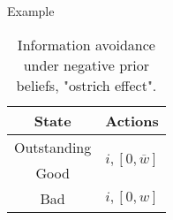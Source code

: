 \documentclass[usenames,dvipsnames,aspectratio=169,11pt, envcountsect, handout]{beamer}
\begin{document}
\begin{frame}{Example}
\begin{table}[H]
\begin{minipage}{0.29\textwidth}
\begin{tabular}{c | c}
				State                             & Actions                                                                        \\
				\hline
				{\color{bleudefrance}Outstanding} & \multirow{2}{*}{{\color{bleudefrance}\( i, \left[ 0, \overline{w} \right] \)}} \\
				{\color{bleudefrance}Good}        &                                                                                \\
				Bad                               & \(  i, \left[0, w \right] \)                                                   \\
			\end{tabular}
			\vspace{0.5cm} %
		\end{minipage}
		\caption{Information avoidance under negative prior beliefs, "ostrich effect".} %
		\label{tab:oistrich}
	\end{table}

\end{frame}
\end{document}
